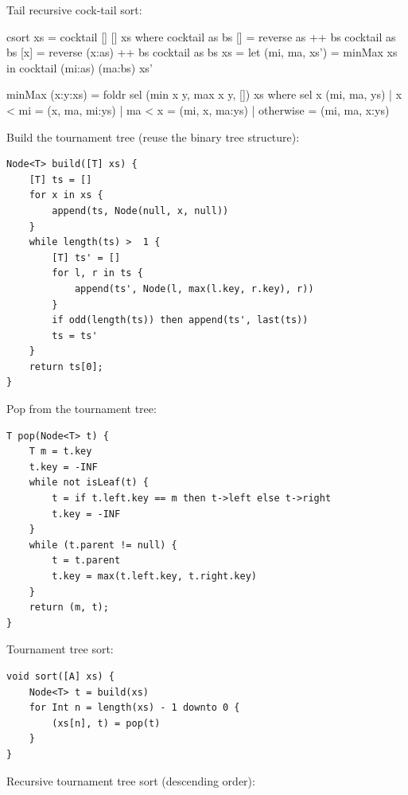 \documentclass[b5paper]{article}
\begin{document}
Tail recursive cock-tail sort:

\begin{Haskell}
csort xs = cocktail [] [] xs
  where
    cocktail as bs []  = reverse as ++ bs
    cocktail as bs [x] = reverse (x:as) ++ bs
    cocktail as bs xs  = let (mi, ma, xs') = minMax xs
                         in cocktail (mi:as) (ma:bs) xs'

minMax (x:y:xs) = foldr sel (min x y, max x y, []) xs
  where
    sel x (mi, ma, ys) | x < mi = (x, ma, mi:ys)
                       | ma < x = (mi, x, ma:ys)
                       | otherwise = (mi, ma, x:ys)
\end{Haskell}

Build the tournament tree (reuse the binary tree structure):

\begin{lstlisting}[language = Bourbaki]
Node<T> build([T] xs) {
    [T] ts = []
    for x in xs {
        append(ts, Node(null, x, null))
    }
    while length(ts) >  1 {
        [T] ts' = []
        for l, r in ts {
            append(ts', Node(l, max(l.key, r.key), r))
        }
        if odd(length(ts)) then append(ts', last(ts))
        ts = ts'
    }
    return ts[0];
}
\end{lstlisting}

Pop from the tournament tree:

\begin{lstlisting}[language = Bourbaki]
T pop(Node<T> t) {
    T m = t.key
    t.key = -INF
    while not isLeaf(t) {
        t = if t.left.key == m then t->left else t->right
        t.key = -INF
    }
    while (t.parent != null) {
        t = t.parent
        t.key = max(t.left.key, t.right.key)
    }
    return (m, t);
}
\end{lstlisting}

Tournament tree sort:

\begin{lstlisting}[language = Bourbaki]
void sort([A] xs) {
    Node<T> t = build(xs)
    for Int n = length(xs) - 1 downto 0 {
        (xs[n], t) = pop(t)
    }
}
\end{lstlisting}

Recursive tournament tree sort (descending order):
\end{document}
